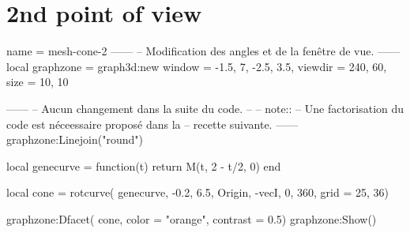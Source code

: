 \documentclass[varwidth, border = 3pt]{standalone}
\begin{document}
\section*{2nd point of view}

\begin{luadraw}{name = mesh-cone-2}
------
-- Modification des angles et de la fenêtre de vue.
------
    local graphzone = graph3d:new{
        window  = {-1.5, 7, -2.5, 3.5},
        viewdir = {240, 60},
        size    = {10, 10}
    }

------
-- Aucun changement dans la suite du code.
--
-- note::
--     Une factorisation du code est néceessaire proposé dans la
--     recette suivante.
------
    graphzone:Linejoin("round")

    local genecurve = function(t)
        return M(t, 2 - t/2, 0)
    end

    local cone = rotcurve(
        genecurve,
        -0.2, 6.5,
        {Origin, -vecI},
        0, 360,
        {grid = {25, 36}})

    graphzone:Dfacet(
        cone,
        {color    = "orange",
		 contrast = 0.5})
    graphzone:Show()
\end{luadraw}
\end{document}
